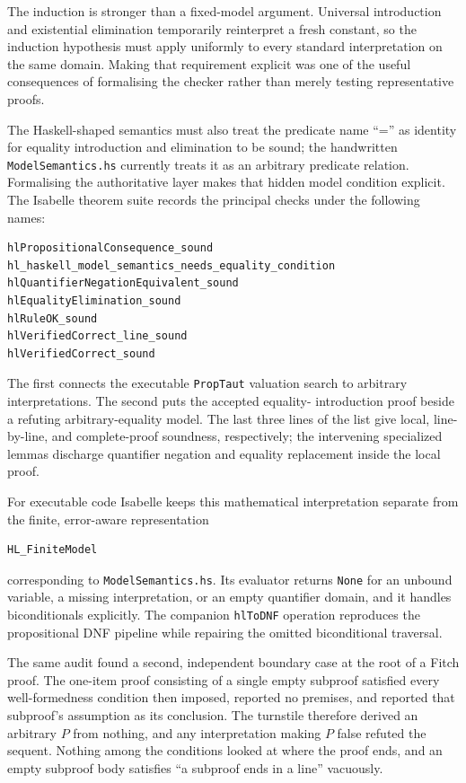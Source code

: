 \documentclass[11pt]{article}
\theoremstyle{plain}
\theoremstyle{definition}
\theoremstyle{remark}
\begin{document}
The induction is stronger than a fixed-model argument.  Universal
introduction and existential elimination temporarily reinterpret a fresh
constant, so the induction hypothesis must apply uniformly to every standard
interpretation on the same domain.  Making that requirement explicit was one
of the useful consequences of formalising the checker rather than merely
testing representative proofs.

The Haskell-shaped semantics must also treat the predicate name ``='' as
identity for equality introduction and elimination to be sound; the
handwritten \verb|ModelSemantics.hs| currently treats it as an arbitrary
predicate relation. Formalising the authoritative layer makes that hidden
model condition explicit. The Isabelle theorem suite records the principal
checks under the following names:

\begin{lstlisting}[language={}]
hlPropositionalConsequence_sound
hl_haskell_model_semantics_needs_equality_condition
hlQuantifierNegationEquivalent_sound
hlEqualityElimination_sound
hlRuleOK_sound
hlVerifiedCorrect_line_sound
hlVerifiedCorrect_sound
\end{lstlisting}

\noindent The first connects the executable \verb|PropTaut| valuation search
to arbitrary interpretations. The second puts the accepted equality-
introduction proof beside a refuting arbitrary-equality model. The last three
lines of the list give local, line-by-line, and complete-proof soundness,
respectively; the intervening specialized lemmas discharge quantifier
negation and equality replacement inside the local proof.

For executable code Isabelle keeps this mathematical interpretation separate
from the finite, error-aware representation

\begin{lstlisting}[language={}]
HL_FiniteModel
\end{lstlisting}

\noindent corresponding to \verb|ModelSemantics.hs|. Its evaluator returns
\verb|None| for an unbound
variable, a missing interpretation, or an empty quantifier domain, and it
handles biconditionals explicitly.  The companion \verb|hlToDNF| operation
reproduces the propositional DNF pipeline while repairing the omitted
biconditional traversal.

The same audit found a second, independent boundary case at the root of a
Fitch proof. The one-item proof consisting of a single empty subproof satisfied
every well-formedness condition then imposed, reported no premises, and
reported that subproof's assumption as its conclusion. The turnstile therefore
derived an arbitrary $P$ from nothing, and any interpretation making $P$ false
refuted the sequent. Nothing among the conditions looked at where the proof
ends, and an empty subproof body satisfies ``a subproof ends in a line''
vacuously.
\end{document}
